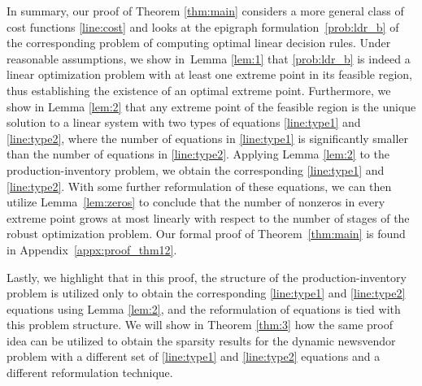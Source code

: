 \documentclass[nonblindrev,mnsc]{informs3} %
\begin{document}
In summary, our proof of Theorem \ref{thm:main} considers a more general class of cost functions \eqref{line:cost} and looks at the epigraph formulation~\eqref{prob:ldr_b} of the corresponding problem of computing optimal linear decision rules. Under reasonable assumptions, we show in~Lemma \ref{lem:1} that \eqref{prob:ldr_b} is indeed a linear optimization problem with at least one extreme point in its feasible region, thus establishing the existence of an optimal extreme point. Furthermore, we show in Lemma \ref{lem:2} that any extreme point of the feasible region is the unique solution to a linear system with two types of equations \eqref{line:type1} and \eqref{line:type2}, where the number of equations in \eqref{line:type1} is significantly smaller than the number of equations in \eqref{line:type2}. Applying Lemma \ref{lem:2} to the production-inventory problem, we obtain the corresponding \eqref{line:type1} and \eqref{line:type2}. With some further reformulation of these equations, we can then utilize Lemma~\ref{lem:zeros} to conclude that the number of nonzeros in every extreme point grows at most linearly with respect to the number of stages of the robust optimization problem. Our formal proof of Theorem~\ref{thm:main} is found in Appendix~\ref{appx:proof_thm12}. 

Lastly, we highlight that in this proof, the structure of the production-inventory problem is utilized only to obtain the corresponding \eqref{line:type1} and \eqref{line:type2} equations using Lemma \ref{lem:2}, and the reformulation of equations is tied with this problem structure. We will show in Theorem \ref{thm:3} how the same proof idea can be utilized to obtain the sparsity results for the dynamic newsvendor problem with a different set of \eqref{line:type1} and \eqref{line:type2} equations and a different reformulation technique.
\end{document}
